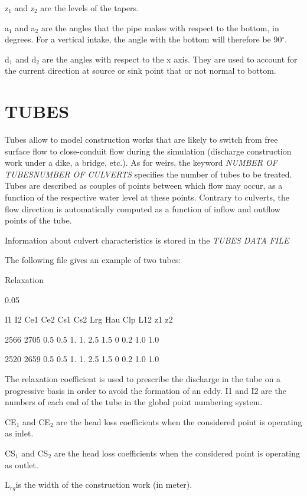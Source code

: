  z${}_{1}$ and z${}_{2}$ are the levels of the tapers.

 a${}_{1}$ and a${}_{2}$ are the angles that the pipe makes with respect to the bottom, in degrees. For a vertical intake, the angle with the bottom will therefore be 90${}^\circ$.

 d${}_{1}$ and d${}_{2}$ are the angles with respect to the x axis. They are used to account for the current direction at source or sink point that or not normal to bottom.


\section{ TUBES}

 Tubes allow to model construction works that are likely to switch from free surface flow to close-conduit flow during the simulation (discharge construction work under a dike, a bridge, etc.). As for weirs, the keyword \textit{NUMBER OF TUBESNUMBER OF CULVERTS} specifies the number of tubes to be treated. Tubes are described as couples of points between which flow may occur, as a function of the respective water level at these points. Contrary to culverts, the flow direction is automatically computed as a function of inflow and outflow points of the tube.

 Information about culvert characteristics is stored in the \textit{TUBES DATA FILE}



 The following file gives an example of two tubes:

 Relaxation

     0.05

 I1   I2   Ce1  Ce2  Cs1  Cs2  Lrg  Hau  Clp  L12   z1  z2

 2566 2705 0.5  0.5  1.   1.   2.5  1.5  0    0.2   1.0 1.0

 2520 2659 0.5  0.5  1.   1.   2.5  1.5  0    0.2   1.0 1.0

 The relaxation coefficient is used to prescribe the discharge in the tube on a progressive basis in order to avoid the formation of an eddy. I1 and I2 are the numbers of each end of the tube in the global point numbering system.

 CE${}_{1}$ and CE${}_{2}$ are the head loss coefficients when the considered point is operating as inlet.

 CS${}_{1}$ and CS${}_{2}$ are the head loss coefficients when the considered point is operating as outlet.

 L${}_{rg }$is the width of the construction work (in meter).

